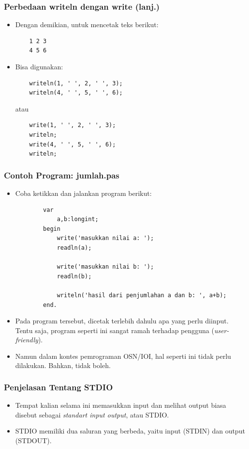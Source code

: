\documentclass{beamer}
\begin{document}
\begin{frame}[fragile]
\frametitle{Perbedaan writeln dengan write (lanj.)}
\begin{itemize}
	\item Dengan demikian, untuk mencetak teks berikut:
	\begin{lstlisting}
	1 2 3
	4 5 6
	\end{lstlisting}
	\item Bisa digunakan:
	\begin{lstlisting}
	writeln(1, ' ', 2, ' ', 3);
	writeln(4, ' ', 5, ' ', 6);
	\end{lstlisting}
	atau
	\begin{lstlisting}
	write(1, ' ', 2, ' ', 3);
	writeln;
	write(4, ' ', 5, ' ', 6);
	writeln;
	\end{lstlisting}
\end{itemize}
\end{frame}

\begin{frame}[fragile]
\frametitle{Contoh Program: jumlah.pas}
\begin{itemize}
	\item Coba ketikkan dan jalankan program berikut:
	\begin{lstlisting}
		var
		    a,b:longint;
		begin
		    write('masukkan nilai a: ');
		    readln(a);
		    
		    write('masukkan nilai b: ');
		    readln(b);
		    
		    writeln('hasil dari penjumlahan a dan b: ', a+b);
		end.
	\end{lstlisting}
	\item Pada program tersebut, dicetak terlebih dahulu apa yang perlu diinput. Tentu saja, program seperti ini sangat ramah terhadap pengguna (\textit{user-friendly}).
	\item Namun dalam kontes pemrograman OSN/IOI, hal seperti ini tidak perlu dilakukan. Bahkan, tidak boleh.
\end{itemize}
\end{frame}

\begin{frame}
\frametitle{Penjelasan Tentang STDIO}
\begin{itemize}
	\item Tempat kalian selama ini memasukkan input dan melihat output biasa disebut sebagai \textit{standart input output}, atau STDIO.
	\item STDIO memiliki dua saluran yang berbeda, yaitu input (STDIN) dan output (STDOUT).
\end{itemize}
\end{frame}
\end{document}
